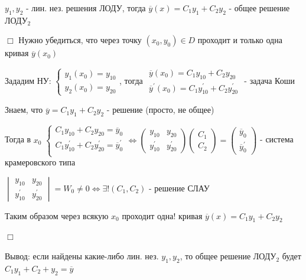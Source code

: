 \documentclass[12pt]{article}
\begin{document}
     $y_1, y_2$ - лин. нез. решения ЛОДУ, тогда $\overline{y}(x) = C_1 y_1 + C_2 y_2$ - общее решение ЛОДУ$_2$

    $\Box$ Нужно убедиться, что через точку $(x_0, y_0) \in D$ проходит и только одна кривая $\overline{y}(x_0)$

    Зададим НУ: $\begin{cases}
                     y_1(x_0) = y_{10} \\
                     y_2(x_0) = y_{20}
    \end{cases}$, тогда $\begin{matrix}\overline{y}(x_0) = C_1 y_{10} + C_2 y_{20} \\ \overline{y}^\prime(x_0) = C_1 y_{10}^\prime + C_2 y_{20}^\prime\end{matrix}$ - задача Коши

    Знаем, что $\overline{y} = C_1 y_1 + C_2 y_2$ - решение (просто, не общее)

    Тогда в $x_0$ $\begin{cases}
                       C_1 y_{10} + C_2 y_{20} = \overline{y}_0 \\
                       C_1 y_{10}^\prime + C_2 y_{20}^\prime = \overline{y}_0^\prime \\
    \end{cases} \Longleftrightarrow \begin{pmatrix}y_{10} & y_{20} \\ y_{10}^\prime & y_{20}^\prime \end{pmatrix} \begin{pmatrix}C_1 \\ C_2\end{pmatrix} = \begin{pmatrix}\overline{y}_0 \\ \overline{y}^\prime_0\end{pmatrix}$ -
    система крамеровского типа

    $\begin{vmatrix}y_{10} & y_{20} \\ y^\prime_{10} & y^\prime_{20}\end{vmatrix} = W_0 \neq 0 \Longleftrightarrow \exists! (C_1, C_2)$ - решение СЛАУ

    Таким образом через всякую $x_0$ проходит одна! кривая $\overline{y}(x) = C_1 y_1 + C_2 y_2$

    $\Box$

    \Nota Вывод: если найдены какие-либо лин. нез. $y_1, y_2$, то общее решение ЛОДУ$_2$ будет $C_1 y_1 + C_2 + y_2 = \overline{y}$
\end{document}
